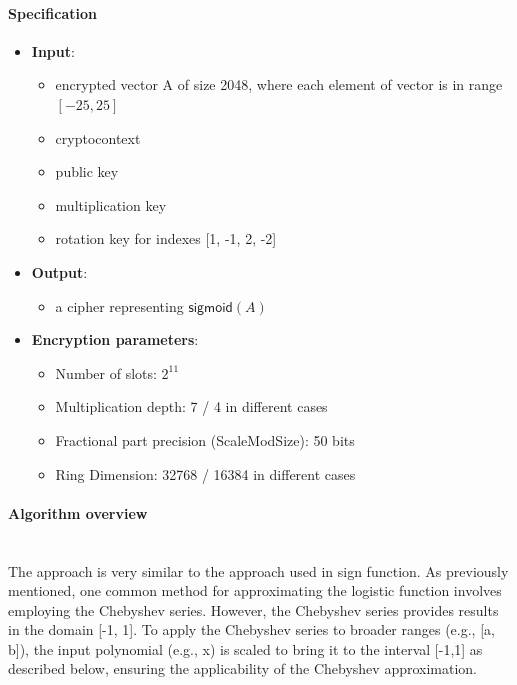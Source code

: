 \documentclass[article]{iacrtrans}
\begin{document}
\paragraph{Specification}
 \begin{itemize}
    \item \textbf{Input}: 
        \begin{itemize}
            \item encrypted vector A of size 2048, where each element of vector is in range $[-25, 25]$
            \item cryptocontext
            \item public key
            \item multiplication key
            \item rotation key for indexes [1, -1, 2, -2]
        \end{itemize}
    \item \textbf{Output}:
        \begin{itemize}
            \item a cipher representing $\textsf{sigmoid}(A)$
        \end{itemize}
    \item \textbf{Encryption parameters}:
        \begin{itemize}
            \item Number of slots: $2^{11}$ 
            \item Multiplication depth: 7 / 4 in different cases
            \item Fractional part precision (ScaleModSize): 50 bits
            \item Ring Dimension: 32768 / 16384 in different cases
        \end{itemize}
\end{itemize}


\paragraph{Algorithm overview}\mbox{}\\

The approach is very similar to the approach used in sign function. As previously mentioned, one common method for approximating the logistic function involves employing the Chebyshev series. However, the Chebyshev series provides results in the domain [-1, 1]. To apply the Chebyshev series to broader ranges (e.g., [a, b]), the input polynomial (e.g., x) is scaled to bring it to the interval [-1,1] as described below, ensuring the applicability of the Chebyshev approximation.
\end{document}
